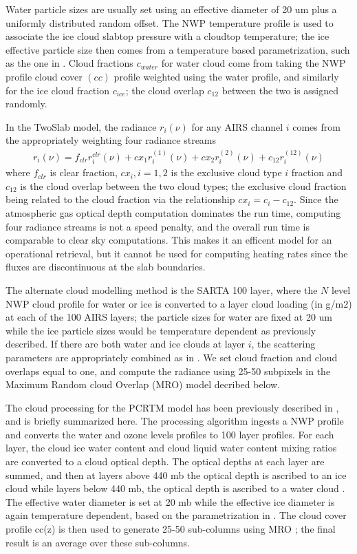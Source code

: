 \documentclass[agupp]{aguplus}              %
\begin{document}
\begin{article}
Water particle sizes are usually set using an effective diameter of 20 um plus a
uniformly distributed random offset. The NWP temperature profile is
used to associate the ice cloud slabtop pressure with a cloudtop
temperature; the ice effective particle size then comes from a
temperature based parametrization, such as the one in
\citep{ou:95}. Cloud fractions $c_{water}$ for water cloud come from
taking the NWP profile cloud cover $(cc)$ profile weighted using the
water profile, and similarly for the ice cloud fraction $c_{ice}$; the
cloud overlap $c_{12}$ between the two is assigned randomly.

In the TwoSlab model, the radiance $r_{i}(\nu)$ for any AIRS channel $i$ comes from
the appropriately weighting four radiance streams 
\begin{eqnarray} r_{i}(\nu) = f_{clr}
r^{clr}_{i}(\nu) + cx_{1} r^{(1)}_{i}(\nu) + cx_{2} r^{(2)}_{i}(\nu) +
c_{12} r^{(12)}_{i}(\nu) 
\end{eqnarray} 
where $f_{clr}$ is clear fraction, $cx_{i},i=1,2$ is the exclusive
cloud type $i$ fraction and $c_{12}$ is the cloud overlap between the
two cloud types; the exclusive cloud fraction being related to the
cloud fraction via the relationship $cx_{i} = c_{i} - c_{12}$. Since
the atmospheric gas optical depth computation dominates the run time,
computing four radiance streams is not a speed penalty, and the
overall run time is comparable to clear sky computations.  This makes
it an efficent model for an operational retrieval, but it
cannot be used for computing heating rates since the fluxes are
discontinuous at the slab boundaries.

The alternate cloud modelling method is the SARTA 100 layer, where the
$N$ level NWP cloud profile for water or ice is converted to a layer
cloud loading (in g/m2) at each of the 100 AIRS layers; the particle
sizes for water are fixed at 20 um while the ice particle sizes would
be temperature dependent as previously described.  If there are both
water and ice clouds at layer $i$, the scattering parameters are
appropriately combined as in \citep{sun:95}. We set cloud fraction and
cloud overlaps equal to one, and compute the radiance using 25-50
subpixels in the Maximum Random cloud Overlap (MRO) model
\cite{chen:13} decribed below.

The cloud processing for the PCRTM model has been previously described
in \cite{chen:13}, and is briefly summarized here. The processing
algorithm ingests a NWP profile and converts the water and ozone
levels profiles to 100 layer profiles. For each layer, the cloud ice
water content and cloud liquid water content mixing ratios are
converted to a cloud optical depth. The optical depths at each layer
are summed, and then at layers above 440 mb the optical depth is
ascribed to an ice cloud while layers below 440 mb, the optical depth
is ascribed to a water cloud \citep{isccp,isccp2}.  The effective
water diameter is set at 20 mb while the effective ice diameter is
again temperature dependent, based on the parametrization in
\citep{ou:95}.  The cloud cover profile cc(z) is then used to generate
25-50 sub-columns using MRO \citep{chen:13}; the final result is an
average over these sub-columns.


\end{article}
\end{document}
